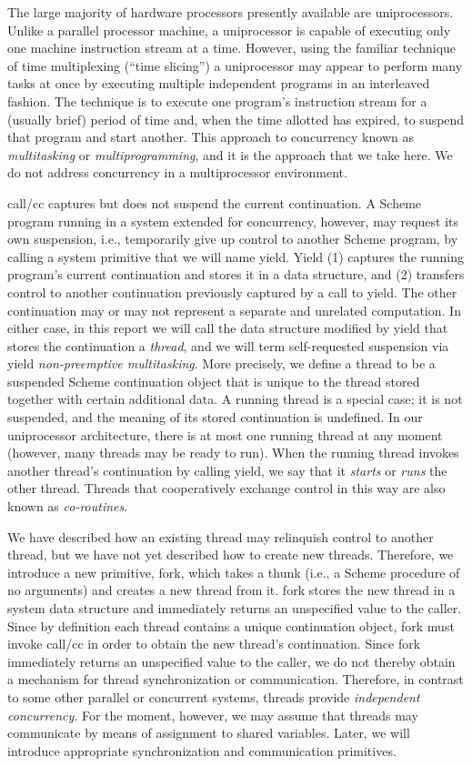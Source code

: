 \documentclass{article}
\begin{document}
The large majority of hardware processors presently available are
uniprocessors.  Unlike a parallel processor machine, a uniprocessor is
capable of executing only one machine instruction stream at a time.
However, using the familiar technique of time multiplexing (``time
slicing'') a uniprocessor may appear to perform many tasks at once by
executing multiple independent programs in an interleaved fashion.
The technique is to execute one program's instruction stream for a
(usually brief) period of time and, when the time allotted has
expired, to suspend that program and start another.  This approach to
concurrency known as {\em multitasking\/} or {\em multiprogramming},
and it is the approach that we take here.  We do not address
concurrency in a multiprocessor environment.

{\sf call/cc} captures but does not suspend the current continuation.
A Scheme program running in a system extended for concurrency,
however, may request its own suspension, i.e., temporarily give up
control to another Scheme program, by calling a system primitive that
we will name {\sf yield}. {\sf Yield} (1) captures the running
program's current continuation and stores it in a data structure, and
(2) transfers control to another continuation previously captured by a
call to {\sf yield}. The other continuation may or may not represent a
separate and unrelated computation.  In either case, in this report we
will call the data structure modified by {\sf yield} that stores the
continuation a {\em thread}, and we will term self-requested
suspension via {\sf yield} {\em non-preemptive multitasking}.  More
precisely, we define a thread to be a suspended Scheme continuation
object that is unique to the thread stored together with certain
additional data.  A running thread is a special case; it is not
suspended, and the meaning of its stored continuation is undefined.
In our uniprocessor architecture, there is at most one running thread
at any moment (however, many threads may be ready to run). When the
running thread invokes another thread's continuation by calling {\sf
yield}, we say that it {\em starts\/} or {\em runs\/} the other
thread.  Threads that cooperatively exchange control in this way are
also known as {\em co-routines}.

We have described how an existing thread may relinquish control to
another thread, but we have not yet described how to create new
threads. Therefore, we introduce a new primitive, {\sf fork}, which
takes a thunk (i.e., a Scheme procedure of no arguments) and creates a
new thread from it. {\sf fork} stores the new thread in a system data
structure and immediately returns an unspecified value to the caller.
Since by definition each thread contains a unique continuation object,
{\sf fork} must invoke {\sf call/cc} in order to obtain the new
thread's continuation.  Since {\sf fork} immediately returns an
unspecified value to the caller, we do not thereby obtain a mechanism
for thread synchronization or communication.  Therefore, in contrast
to some other parallel or concurrent systems, threads provide {\em
independent concurrency}.  For the moment, however, we may assume that
threads may communicate by means of assignment to shared
variables. Later, we will introduce appropriate synchronization and
communication primitives.
\end{document}
